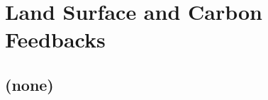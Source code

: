 
\cleardoublepage


\chapter{Land Surface and Carbon Feedbacks}\label{ch:land-surface}

\hfill \break

\newpage

\section{(none)}

